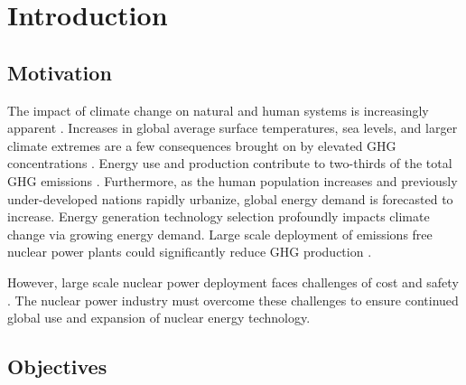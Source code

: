 \chapter{Introduction}
\section{Motivation}
The impact of climate change on natural and human systems 
is increasingly apparent \cite{noauthor_climate_2018}.
Increases in global average 
surface temperatures, sea levels, and larger climate extremes
are a few consequences brought on by elevated \gls{GHG} 
concentrations \cite{noauthor_climate_2018}.
Energy use and production contribute to 
two-thirds of the total \gls{GHG}
emissions \cite{noauthor_climate_2018}.
Furthermore, as the human population increases and previously 
under-developed nations rapidly urbanize, 
global energy demand is forecasted to increase.  
Energy generation technology selection 
profoundly impacts climate change via growing energy demand. 
Large scale deployment of emissions free nuclear power plants 
could significantly reduce GHG production 
\cite{noauthor_climate_2018}.  

However, large scale nuclear power deployment faces
challenges of cost and safety \cite{petti_future_2018}. 
The nuclear power industry must overcome these challenges 
to ensure continued global use and expansion 
of nuclear energy technology. 


\section{Objectives}